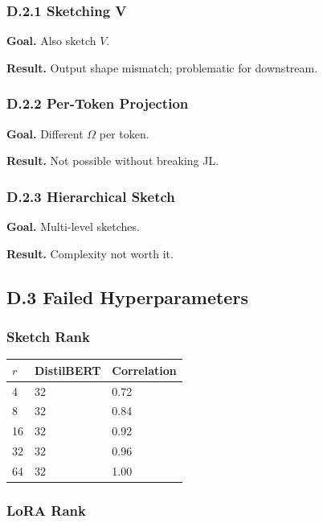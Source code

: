\subsubsection{D.2.1 Sketching V}

\textbf{Goal.} Also sketch $V$.

\textbf{Result.} Output shape mismatch; problematic for downstream.

\subsubsection{D.2.2 Per-Token Projection}

\textbf{Goal.} Different $\Omega$ per token.

\textbf{Result.} Not possible without breaking JL.

\subsubsection{D.2.3 Hierarchical Sketch}

\textbf{Goal.} Multi-level sketches.

\textbf{Result.} Complexity not worth it.

\subsection{D.3 Failed Hyperparameters}

\subsubsection{Sketch Rank}

\begin{table}[H]
\centering
\small
\begin{tabular}{lll}
\toprule
\textbf{$r$} & \textbf{DistilBERT} & \textbf{Correlation} \\
\midrule
4 & 32 & 0.72 \\
8 & 32 & 0.84 \\
16 & 32 & 0.92 \\
32 & 32 & 0.96 \\
64 & 32 & 1.00 \\
\bottomrule
\end{tabular}
\end{table}

\subsubsection{LoRA Rank}

